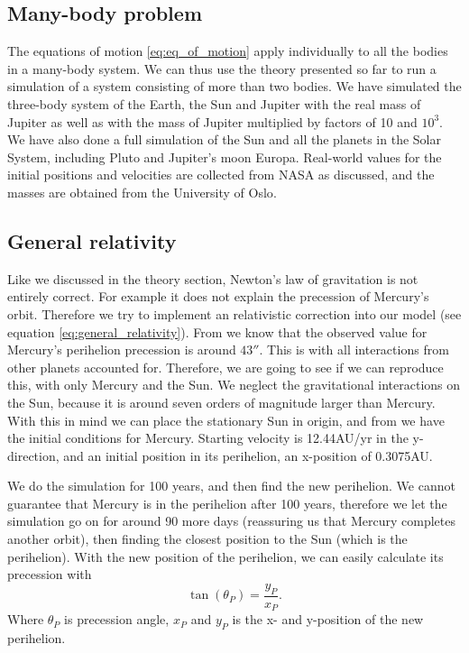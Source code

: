 \documentclass[reprint, english,notitlepage,nofootinbib]{revtex4-1}  %
\begin{document}
\subsection{Many-body problem}

The equations of motion \eqref{eq:eq_of_motion} apply individually to all the bodies in a many-body system. We can thus use the theory presented so far to run a simulation of a system consisting of more than two bodies. We have simulated the three-body system of the Earth, the Sun and Jupiter with the real mass of Jupiter as well as with the mass of Jupiter multiplied by factors of 10 and $10^3$. We have also done a full simulation of the Sun and all the planets in the Solar System, including Pluto and Jupiter's moon Europa. Real-world values for the initial positions and velocities are collected from NASA as discussed, and the masses are obtained from the University of Oslo\citep{oppgavetekst}.


\subsection{General relativity}

Like we discussed in the theory section, Newton's law of gravitation is not entirely correct. For example it does not explain the precession of Mercury's orbit. Therefore we try to implement an relativistic correction into our model (see equation \eqref{eq:general_relativity}). From \citep{oppgavetekst} we know that the observed value for Mercury's perihelion precession is around $43''$. This is with all interactions from other planets accounted for. Therefore, we are going to see if we can reproduce this, with only Mercury and the Sun. We neglect the gravitational interactions on the Sun, because it is around seven orders of magnitude larger than Mercury. With this in mind we can place the stationary Sun in origin, and from \citep{oppgavetekst} we have the initial conditions for Mercury. Starting velocity is 12.44AU/yr in the y-direction, and an initial position in its perihelion, an x-position of 0.3075AU.

We do the simulation for 100 years, and then find the new perihelion. We cannot guarantee that Mercury is in the perihelion after 100 years, therefore we let the simulation go on for around 90 more days (reassuring us that Mercury completes another orbit), then finding the closest position to the Sun (which is the perihelion). With the new position of the perihelion, we can easily calculate its precession with
\begin{equation*}
	\tan(\theta_P) = \frac{y_P}{x_P}.
\end{equation*}
Where $\theta_P$ is precession angle, $x_P$ and $y_P$ is the x- and y-position of the new perihelion.
\end{document}
